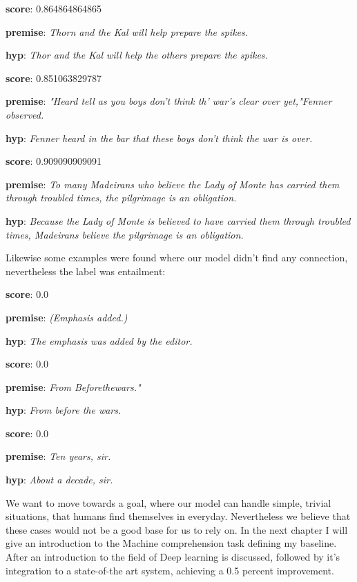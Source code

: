\textbf{score}: 0.864864864865

\textbf{premise}: \textit{Thorn and the Kal will help prepare the spikes.}

\textbf{hyp}: \textit{Thor and the Kal will help the others prepare the spikes. }
\newline

\textbf{score}: 0.851063829787

\textbf{premise}:  \textit{"Heard tell as you boys don't think th' war's clear over yet,"Fenner observed.}

\textbf{hyp}: \textit{Fenner heard in the bar that these boys don't think the war is over.}
\newline

\textbf{score}: 0.909090909091

\textbf{premise}: \textit{To many Madeirans who believe the Lady of Monte has carried them through troubled times, the pilgrimage is an obligation.}

\textbf{hyp}: \textit{Because the Lady of Monte is believed to have carried them through troubled times, Madeirans believe the pilgrimage is an obligation.}
\newline

Likewise some examples were found where our model didn't find any connection, nevertheless the label was entailment:

\textbf{score}: 0.0

\textbf{premise}: \textit{(Emphasis added.)}

\textbf{hyp}: \textit{The emphasis was added by the editor.}
\newline

\textbf{score}: 0.0

\textbf{premise}: \textit{From Beforethewars."}

\textbf{hyp}: \textit{From before the wars.}
\newline

\textbf{score}: 0.0

\textbf{premise}: \textit{Ten years, sir.}

\textbf{hyp}: \textit{About a decade, sir.}
\newline

We want to move towards a goal, where our model can handle simple, trivial situations, that humans find themselves in everyday. Nevertheless we believe that these cases would not be a good base for us to rely on.
In the next chapter I will give an introduction to the Machine comprehension task defining my baseline. After an introduction to the field of Deep learning is discussed, followed by it's integration to a state-of-the art system, achieving a 0.5 percent improvement.